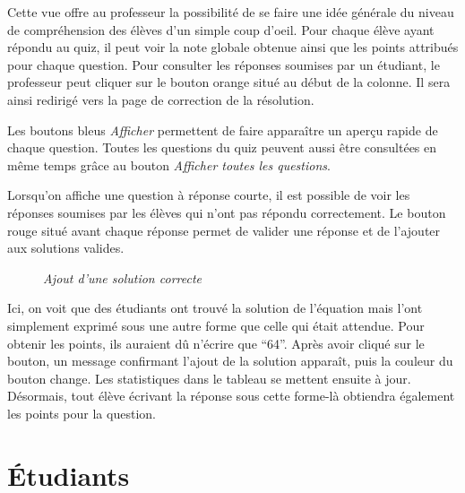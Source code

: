 \documentclass[a4paper,11pt,openany,oneside]{sphinxmanual}
\begin{document}
Cette vue offre au professeur la possibilité de se faire une idée générale du niveau de compréhension des élèves d'un simple coup d'oeil. Pour chaque élève ayant répondu au quiz, il peut voir la note globale obtenue ainsi que les points attribués pour chaque question. Pour consulter les réponses soumises par un étudiant, le professeur peut cliquer sur le bouton orange situé au début de la colonne. Il sera ainsi redirigé vers la page de correction de la résolution.

Les boutons bleus \emph{Afficher} permettent de faire apparaître un aperçu rapide de chaque question. Toutes les questions du quiz peuvent aussi être consultées en même temps grâce au bouton \emph{Afficher toutes les questions}.

Lorsqu'on affiche une question à réponse courte, il est possible de voir les réponses soumises par les élèves qui n'ont pas répondu correctement. Le bouton rouge situé avant chaque réponse permet de valider une réponse et de l'ajouter aux solutions valides.
\begin{figure}[htbp]
\centering
\capstart

\caption{\emph{Ajout d'une solution correcte}}\end{figure}

Ici, on voit que des étudiants ont trouvé la solution de l'équation mais l'ont simplement exprimé sous une autre forme que celle qui était attendue. Pour obtenir les points, ils auraient dû n'écrire que ``64''. Après avoir cliqué sur le bouton, un message confirmant l'ajout de la solution apparaît, puis la couleur du bouton change. Les statistiques dans le tableau se mettent ensuite à jour. Désormais, tout élève écrivant la réponse sous cette forme-là obtiendra également les points pour la question.


\section{Étudiants}
\label{doc-user:etudiants}
\end{document}
